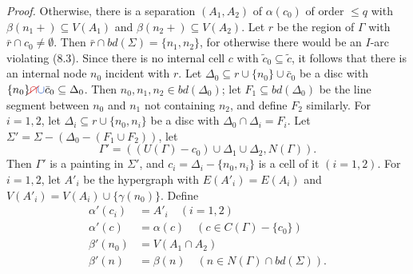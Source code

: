 \textit{Proof.} Otherwise, there is a separation $(A_1, A_2)$ of $\alpha(c_0)$ of order $\le q$ with $\beta(n_1 +) \subseteq V(A_1)$ and $\beta(n_2 +) \subseteq V(A_2)$. Let $r$ be the region of $\Gamma$ with $\bar{r} \cap c_0 \ne \emptyset$. Then $\bar{r} \cap bd(\Sigma) = \{n_1, n_2\}$, for otherwise there would be an $I$-arc violating (8.3). Since there is no internal cell $c$ with $\tilde{c}_0 \subseteq \tilde{c}$, it follows that there is an internal node $n_0$ incident with $r$. Let $\Delta_0 \subseteq r \cup \{n_0\} \cup \bar{c}_0$ be a disc with $\{n_0\} \delm{\cap}\fix{\cup} \bar{c}_0 \subseteq \Delta_0$. Then $n_0, n_1, n_2 \in bd(\Delta_0)$; let $F_1 \subseteq bd(\Delta_0)$ be the line segment between $n_0$ and $n_1$ not containing $n_2$, and define $F_2$ similarly. For $i = 1, 2$, let $\Delta_i \subseteq r \cup \{n_0, n_i\}$ be a disc with $\Delta_0 \cap \Delta_i = F_i$. Let $\Sigma' = \Sigma - (\Delta_0 - (F_1 \cup F_2))$, let
\begin{equation*}
\Gamma' = ((U(\Gamma) - c_0) \cup \Delta_1 \cup \Delta_2, N(\Gamma)).
\end{equation*}
Then $\Gamma'$ is a painting in $\Sigma'$, and $c_i = \Delta_i - \{n_0, n_i\}$ is a cell of it $(i = 1, 2)$. For $i = 1, 2$, let $A'_i$ be the hypergraph with $E(A'_i) = E(A_i)$ and $V(A'_i) = V(A_i) \cup \{\gamma(n_0)\}$. Define
\begin{align*}
\alpha'(c_i) &= A'_i \quad (i = 1, 2) \\
\alpha'(c) &= \alpha(c) \quad (c \in C(\Gamma) - \{c_0\}) \\
\beta'(n_0) &= V(A_1 \cap A_2) \\
\beta'(n) &= \beta(n) \quad (n \in N(\Gamma) \cap bd(\Sigma)).
\end{align*}
